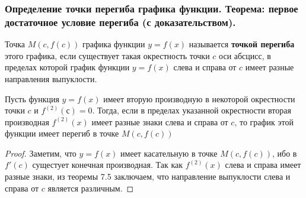 \documentclass[10pt]{article}
\begin{document}
    \subsubsection{Определение точки перегиба графика функции. Теорема: первое достаточное условие перегиба (с доказательством).}
    \begin{definition}
        Точка $M(c, f(c))$ графика функции $y = f(x)$ называется \textbf{точкой перегиба} этого графика, если существует такая окрестность точки $c$ оси абсцисс, в пределах которой график функции $y = f(x)$ слева и справа от $c$ имеет разные направления выпуклости.
    \end{definition}
    \begin{theorem}
        Пусть функция $y = f(x)$ имеет вторую производную в некоторой окрестности точки $c$ и $f^{(2)}(с) = 0$. Тогда, если в пределах указанной окрестности вторая производная $f^{(2)}(x)$ имеет разные знаки слева и справа от $c$, то график этой функции имеет перегиб в точке $M(c, f(c))$
    \end{theorem}
    \begin{proof}
        Заметим, что $y = f(x)$ имеет касательную в точке $M(c, f(c))$, ибо в $f'(c)$ сущестует конечная производная. Так как $f^{(2)}(x)$ слева и справа имеет разные знаки, из теоремы 7.5 заключаем, что направление выпуклости слева и справа от $c$ является различным.
    \end{proof}
\end{document}

